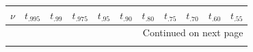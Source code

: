 \documentclass[12pt,a4paper]{article}
\begin{document}
\begin{enumerate}
\begin{center}
\begin{minipage}{0.45\textwidth}
\end{minipage}
\end{center}
\vspace{0.5cm}

\begin{center}
\begin{longtable}{c | ccccc | ccccc}
\toprule
$\nu$ & $t_{.995}$ & $t_{.99}$ & $t_{.975}$ & $t_{.95}$ & $t_{.90}$ & $t_{.80}$ & $t_{.75}$ & $t_{.70}$ & $t_{.60}$ & $t_{.55}$ \\
\midrule
\endhead

\midrule
\multicolumn{11}{r}{{Continued on next page}} \\
\bottomrule
\endfoot

\bottomrule
\endlastfoot


\end{longtable}
\end{center}
\end{enumerate}
\end{document}
